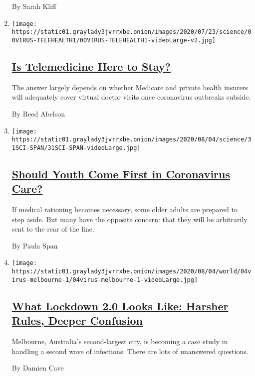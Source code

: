 \begin{enumerate}
  By Sarah Kliff
\item
  \texttt{[image: https://static01.graylady3jvrrxbe.onion/images/2020/07/23/science/00VIRUS-TELEHEALTH1/00VIRUS-TELEHEALTH1-videoLarge-v2.jpg]}

  \hypertarget{is-telemedicine-here-to-stay-1}{%
  \subsection{\texorpdfstring{\href{/2020/08/03/health/covid-telemedicine-congress.html}{Is
  Telemedicine Here to
  Stay?}}{Is Telemedicine Here to Stay?}}\label{is-telemedicine-here-to-stay-1}}

  The answer largely depends on whether Medicare and private health
  insurers will adequately cover virtual doctor visits once coronavirus
  outbreaks subside.

  By Reed Abelson
\item
  \texttt{[image: https://static01.graylady3jvrrxbe.onion/images/2020/08/04/science/31SCI-SPAN/31SCI-SPAN-videoLarge.jpg]}

  \hypertarget{should-youth-come-first-in-coronavirus-care-1}{%
  \subsection{\texorpdfstring{\href{/2020/07/31/health/coronavirus-ethics-rationing-elderly.html}{Should
  Youth Come First in Coronavirus
  Care?}}{Should Youth Come First in Coronavirus Care?}}\label{should-youth-come-first-in-coronavirus-care-1}}

  If medical rationing becomes necessary, some older adults are prepared
  to step aside. But many have the opposite concern: that they will be
  arbitrarily sent to the rear of the line.

  By Paula Span
\item
  \texttt{[image: https://static01.graylady3jvrrxbe.onion/images/2020/08/04/world/04virus-melbourne-1/04virus-melbourne-1-videoLarge.jpg]}

  \hypertarget{what-lockdown-20-looks-like-harsher-rules-deeper-confusion}{%
  \subsection{\texorpdfstring{\href{/2020/08/04/world/australia/coronavirus-melbourne-lockdown.html}{What
  Lockdown 2.0 Looks Like: Harsher Rules, Deeper
  Confusion}}{What Lockdown 2.0 Looks Like: Harsher Rules, Deeper Confusion}}\label{what-lockdown-20-looks-like-harsher-rules-deeper-confusion}}

  Melbourne, Australia's second-largest city, is becoming a case study
  in handling a second wave of infections. There are lots of unanswered
  questions.

  By Damien Cave
\end{enumerate}

